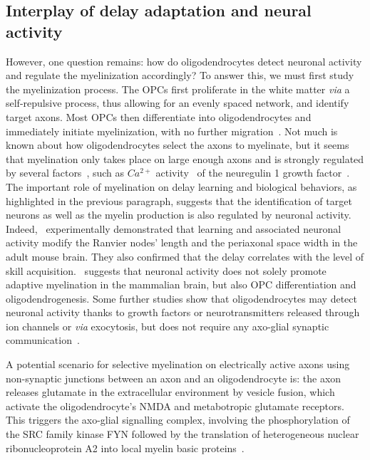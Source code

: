 \documentclass[brainsci, %
               review,submit,pdftex,moreauthors
               ]{Definitions/mdpi}
\begin{document}
\subsection{Interplay of delay adaptation and neural activity}
However, one question remains: how do oligodendrocytes detect neuronal activity and regulate the myelinization accordingly? To answer this, we must first study the myelinization process. The OPCs first proliferate in the white matter \textit{via} a self-repulsive process, thus allowing for an evenly spaced network, and identify target axons. Most OPCs then differentiate into oligodendrocytes and immediately initiate myelinization, with no further migration~\citep{simons_oligodendrocytes_2016}. Not much is known about how oligodendrocytes select the axons to myelinate, but it seems that myelination only takes place on large enough axons and is strongly regulated by several factors~\citep{kuhn_oligodendrocytes_2019}, such as $Ca^{2+}$ activity~\citep{baraban_ca2_2018} of the neuregulin 1 growth factor~\citep{nave_axonal_2006}. The important role of myelination on delay learning and biological behaviors, as highlighted in the previous paragraph, suggests that the identification of target neurons as well as the myelin production is also regulated by neuronal activity. Indeed,~\citet{cullen_periaxonal_2021} experimentally demonstrated that learning and associated neuronal activity modify the Ranvier nodes' length and the periaxonal space width in the adult mouse brain. They also confirmed that the delay correlates with the level of skill acquisition.~\citet{gibson_neuronal_2014} suggests that neuronal activity does not solely promote adaptive myelination in the mammalian brain, but also OPC differentiation and oligodendrogenesis. Some further studies show that oligodendrocytes may detect neuronal activity thanks to growth factors or neurotransmitters released through ion channels or \textit{via} exocytosis, but does not require any axo-glial synaptic communication~\citep{fields_new_2015}. 

A potential scenario for selective myelination on electrically active axons using non-synaptic junctions between an axon and an oligodendrocyte is: the axon releases glutamate in the extracellular environment by vesicle fusion, which activate the oligodendrocyte's NMDA and metabotropic glutamate receptors. This triggers the axo-glial signalling complex, involving the phosphorylation of the SRC family kinase FYN followed by the translation of heterogeneous nuclear ribonucleoprotein A2 into local myelin basic proteins~\citep{fields_new_2015}.
\end{document}

